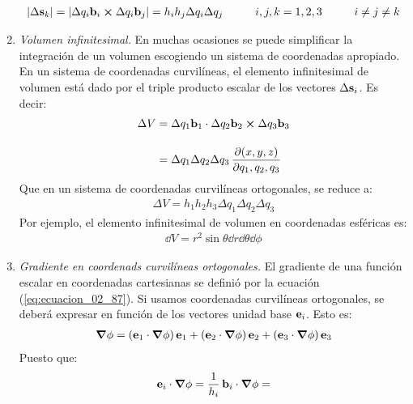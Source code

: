 \documentclass[12pt]{article}
\begin{document}
\begin{enumerate}[label=\alph*)]
\begin{align}
        \abs{\Delta \vb{s}_{k}} = \abs{\Delta q_{i} \vb{b}_{i} \cp \Delta q_{i} \vb{b}_{j}} = h_{i} h_{j} \Delta q_{i} \Delta q_{j} \hspace{1cm} i, j, k =1, 2, 3 \hspace{1cm} i \neq j \neq k
        \label{eq:ecuacion_02_92}
    \end{align}
    \item \emph{Volumen infinitesimal. } En muchas ocasiones se puede simplificar la  integración de un volumen escogiendo un sistema de coordenadas apropiado. En un sistema de coordenadas curvilíneas, el elemento infinitesimal de volumen está dado por el triple producto escalar de los vectores $\Delta \vb{s}_{i}$. Es decir:
    \begin{align}
    \begin{aligned}[b]
        \Delta V &= \Delta q_{1} \vb{b}_{1} \cdot \Delta q_{2} \vb{b}_{2} \cp \Delta q_{3} \vb{b}_{3} \\[1em]
        &= \Delta q_{1} \Delta q_{2} \Delta q_{3} \, \pdv{(x, y, z)}{q_{1}, q_{2}, q_{3}}
    \end{aligned}
    \label{eq:ecuacion_02_93}
    \end{align}
    Que en un sistema de coordenadas curvilíneas ortogonales, se reduce a:
    \begin{align}
        \Delta V = h_{1} h_{2} h_{3} \Delta q_{1} \Delta q_{2} \Delta q_{3}
        \label{eq:ecuacion_02_94}
    \end{align}
    Por ejemplo, el elemento infinitesimal de volumen en coordenadas esféricas es:
    \begin{align*}
        \dd{V} = r^{2} \sin \theta \dd{r} \dd{\theta} \dd{\phi}
    \end{align*}
    \item \emph{Gradiente en coordenads curvilíneas ortogonales. } El gradiente de una función escalar en coordenadas cartesianas se definió por la ecuación (\ref{eq:ecuacion_02_87}). Si usamos coordenadas curvilíneas ortogonales, se deberá expresar en función de los vectores unidad base $\vb{e}_{i}$. Esto es:
    \begin{align*}
        \grad{\phi} = \left( \vb{e}_{1} \cdot \grad{\phi} \right) \vb{e}_{1} + \left( \vb{e}_{2} \cdot \grad{\phi} \right) \vb{e}_{2} + \left( \vb{e}_{3} \cdot \grad{\phi} \right) \vb{e}_{3}
    \end{align*}
    Puesto que:
    \begin{align*}
        \vb{e}_{i} \cdot \grad{\phi} &= \dfrac{1}{h_{i}} \, \vb{b}_{i} \cdot \grad{\phi} = \\[1em]

\end{align*}
\end{enumerate}
\end{document}
